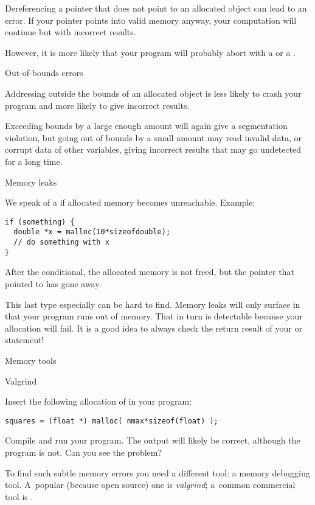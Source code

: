 Dereferencing a pointer that does not point to an allocated object can lead to an error.
If your pointer points into valid memory anyway, your computation will continue but with incorrect results.

However, it is more likely that
your program will probably abort with a
 or a .

 {Out-of-bounds errors}

Addressing outside the bounds of an allocated object is less likely to crash your program and more likely to give incorrect results.

Exceeding bounds by a large enough amount will again give a
segmentation violation, but going out of bounds by a small amount may
read invalid data, or corrupt data of other variables, giving
incorrect results that may go undetected for a long time.

 {Memory leaks}

We speak of a  if allocated memory becomes unreachable.
Example:
\begin{lstlisting}
if (something) {
  double *x = malloc(10*sizeofdouble);
  // do something with x
}
\end{lstlisting}
After the conditional, the allocated memory is not freed, but the
pointer that pointed to has gone away.

This last type especially can be hard to find.
Memory leaks will only surface in that your program runs out of
  memory. That in turn is detectable because your allocation will
  fail. It is a good idea to always check the return result of your
   or  statement!

 {Memory tools}

 {Valgrind}
\label{sec:valgrind}

Insert the following allocation of  in your program:
\begin{verbatim}
squares = (float *) malloc( nmax*sizeof(float) );
\end{verbatim}
Compile and run your program. The output will likely be correct,
although the program is not. Can you see the problem?


To find such subtle memory errors you need a different tool: a memory
debugging tool. A~popular (because open source) one is
\emph{valgrind}; a~common commercial tool is .

